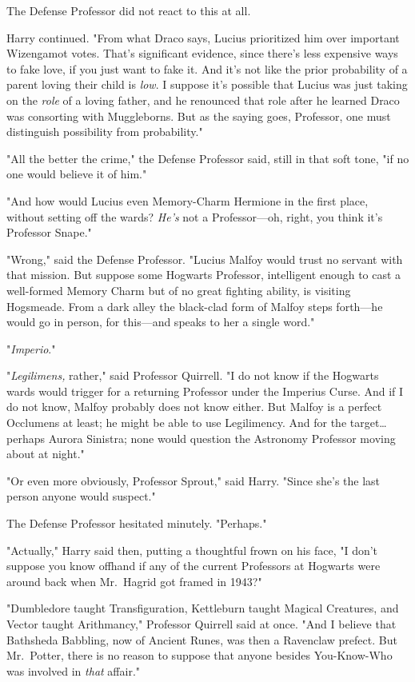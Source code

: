 The Defense Professor did not react to this at all.

Harry continued. "From what Draco says, Lucius prioritized him over important Wizengamot votes. That's significant evidence, since there's less expensive ways to fake love, if you just want to fake it. And it's not like the prior probability of a parent loving their child is \emph{low}. I suppose it's possible that Lucius was just taking on the \emph{role} of a loving father, and he renounced that role after he learned Draco was consorting with Muggleborns. But as the saying goes, Professor, one must distinguish possibility from probability."

"All the better the crime," the Defense Professor said, still in that soft tone, "if no one would believe it of him."

"And how would Lucius even Memory-Charm Hermione in the first place, without setting off the wards? \emph{He's} not a Professor---oh, right, you think it's Professor Snape."

"Wrong," said the Defense Professor. "Lucius Malfoy would trust no servant with that mission. But suppose some Hogwarts Professor, intelligent enough to cast a well-formed Memory Charm but of no great fighting ability, is visiting Hogsmeade. From a dark alley the black-clad form of Malfoy steps forth---he would go in person, for this---and speaks to her a single word."

"\emph{Imperio}."

"\emph{Legilimens,} rather," said Professor Quirrell. "I do not know if the Hogwarts wards would trigger for a returning Professor under the Imperius Curse. And if I do not know, Malfoy probably does not know either. But Malfoy is a perfect Occlumens at least; he might be able to use Legilimency. And for the target{\ldots}perhaps Aurora Sinistra; none would question the Astronomy Professor moving about at night."

"Or even more obviously, Professor Sprout," said Harry. "Since she's the last person anyone would suspect."

The Defense Professor hesitated minutely. "Perhaps."

"Actually," Harry said then, putting a thoughtful frown on his face, "I don't suppose you know offhand if any of the current Professors at Hogwarts were around back when Mr.~Hagrid got framed in 1943?"

"Dumbledore taught Transfiguration, Kettleburn taught Magical Creatures, and Vector taught Arithmancy," Professor Quirrell said at once. "And I believe that Bathsheda Babbling, now of Ancient Runes, was then a Ravenclaw prefect. But Mr.~Potter, there is no reason to suppose that anyone besides You-Know-Who was involved in \emph{that} affair."

